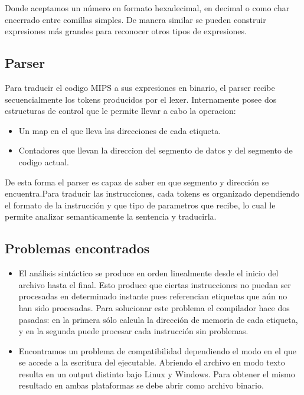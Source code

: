 \documentclass[12pt]{article}
\begin{document}
Donde aceptamos un número en formato hexadecimal, en decimal o como char encerrado entre comillas simples. De manera similar se pueden construir expresiones más grandes para reconocer otros tipos de expresiones.

\subsection{Parser}

Para traducir el codigo MIPS a sus expresiones en binario, el parser recibe secuencialmente los tokens producidos por el lexer.
Internamente posee dos estructuras de control que le permite llevar a cabo la operacion:
\begin{itemize}
	\item Un map en el que lleva las direcciones de cada etiqueta.
	\item Contadores que llevan la direccion del segmento de datos y del segmento de codigo actual.
\end{itemize}
De esta forma el parser es capaz de saber en que segmento y dirección  se encuentra.Para traducir las instrucciones,
cada tokens es organizado dependiendo el formato de la instrucción y que tipo de parametros que recibe, lo cual le permite analizar
semanticamente la sentencia y traducirla.


\subsection{Problemas encontrados}

\begin{itemize}

\item	El análisis sintáctico se produce en orden linealmente desde el inicio del archivo hasta el final. Esto produce que ciertas instrucciones no puedan ser procesadas en determinado instante pues referencian etiquetas que aún no han sido procesadas. Para solucionar este problema el compilador hace dos pasadas: en la primera sólo calcula la dirección de memoria de cada etiqueta, y en la segunda puede procesar cada instrucción sin problemas.

\item    Encontramos un problema de compatibilidad dependiendo el modo en el que se accede a la escritura del ejecutable. Abriendo el archivo en modo texto resulta en un output distinto bajo Linux y Windows. Para obtener el mismo resultado en ambas plataformas se debe abrir como archivo binario.
    
\end{itemize}
\end{document}
